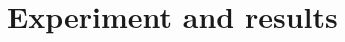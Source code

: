 \documentclass[num-refs]{wiley-article}
\begin{document}





\section{Experiment and results}
\label{sec:experiments}
\end{document}
